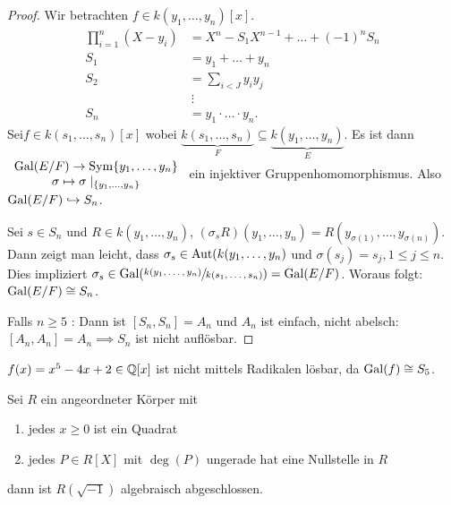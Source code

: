 \begin{proof}
	Wir betrachten $f \in k(y_1,\ldots,y_{n})[x]$.
	\begin{align*}
		\prod_{i=1}^{n} (X-y_{i}) &= X^{n}-S_1 X^{n-1} + \ldots + (-1)^{n} S_{n}\\
		S_1 &= y_1+\ldots+y_{n}\\
		S_2 &= \sum_{i<J} y_i y_{j}\\
			&\ \vdots\\
		S_{n} &= y_1 \cdot \ldots \cdot y_{n}
	.\end{align*}
	Sei$f \in k(s_1,\ldots,s_{n})[x]$ wobei $\underbrace{k(s_1,\ldots,s_{n})}_{F} \subseteq \underbrace{k(y_1,\ldots,y_{n})}_{E}$.
	Es ist dann $\begin{array}{c} \operatorname{Gal}(E/F) \to \operatorname{Sym} \{y_1,\ldots,y_{n}\}\\ \sigma \mapsto \sigma \mid_{\{y_1,\ldots,y_{n}\}}\\ \end{array}$ ein injektiver Gruppenhomomorphismus.
	Also $\operatorname{Gal}(E /F) \hookrightarrow S_{n}$.

	Sei $s \in S_{n}$ und $R \in k(y_1,\ldots,y_{n})$, $(\sigma_{s}R)(y_1,\ldots,y_{n}) = R(y_{\sigma(1)},\ldots,y_{\sigma(n)})$.
	Dann zeigt man leicht, dass $\sigma_{s} \in \operatorname{Aut}(k(y_1,\ldots,y_{n})$ und $\sigma(s_{j}) = s_{j}, 1 \leq j \leq n$.
	Dies impliziert $\sigma_{s} \in \operatorname{Gal}(\sfrac{k(y_1,\ldots,y_{n})}{k(s_1,\ldots,s_{n})}) = \operatorname{Gal}(E / F)$.
	Woraus folgt: $\operatorname{Gal}(E / F) \cong S_{n}$.

	Falls $n \geq 5$ : Dann ist  $[S_{n}, S_{n}] = A_{n}$ und $A_{n}$ ist einfach, nicht abelsch: $[A_{n}, A_{n}] = A_{n} \implies S_{n}$ ist nicht auflösbar.
\end{proof}

\begin{corollary}
	$f(x) = x^{5} - 4x + 2 \in \mathbb{Q}[x]$ ist nicht mittels Radikalen lösbar, da $\operatorname{Gal}(f) \cong S_{5}$.
\end{corollary}

Sei $R$ ein angeordneter Körper mit
\begin{enumerate}
	\item jedes $x \geq 0$ ist ein Quadrat
	\item jedes $P \in R[X]$ mit  $\deg(P)$ ungerade hat eine Nullstelle in $R$
\end{enumerate}
dann ist $R(\sqrt{-1})$ algebraisch abgeschlossen.





























